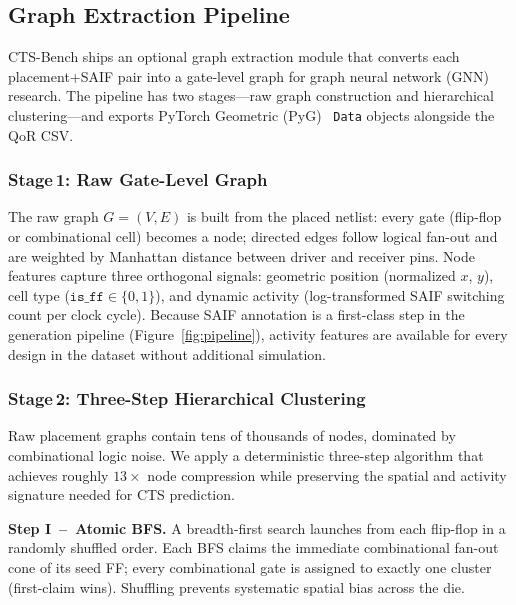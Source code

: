 \documentclass[acmsmall,review,anonymous]{acmart}
\begin{document}
\subsection{Graph Extraction Pipeline}
\label{sec:graph}

CTS-Bench ships an optional graph extraction module that converts each
placement+SAIF pair into a gate-level graph for graph neural network (GNN)
research.  The pipeline has two stages---raw graph construction and
hierarchical clustering---and exports PyTorch Geometric (PyG)~\cite{kipf2017semisupervisedclassificationgraphconvolutional}
\texttt{Data} objects alongside the QoR CSV.

\subsubsection*{Stage\,1: Raw Gate-Level Graph}

The raw graph $G=(V,E)$ is built from the placed netlist: every gate
(flip-flop or combinational cell) becomes a node; directed edges follow
logical fan-out and are weighted by Manhattan distance between driver and
receiver pins.  Node features capture three orthogonal signals: geometric
position (normalized $x$, $y$), cell type ($\texttt{is\_ff}\in\{0,1\}$),
and dynamic activity (log-transformed SAIF switching count per clock cycle).
Because SAIF annotation is a first-class step in the generation pipeline
(Figure~\ref{fig:pipeline}), activity features are available for every
design in the dataset without additional simulation.

\subsubsection*{Stage\,2: Three-Step Hierarchical Clustering}

Raw placement graphs contain tens of thousands of nodes, dominated by
combinational logic noise.  We apply a deterministic three-step algorithm
that achieves roughly $13{\times}$ node compression while preserving the
spatial and activity signature needed for CTS prediction.

\medskip\noindent\textbf{Step I~--~Atomic BFS.}
A breadth-first search launches from each flip-flop in a randomly shuffled
order.  Each BFS claims the immediate combinational fan-out cone of its seed
FF; every combinational gate is assigned to exactly one cluster (first-claim
wins).  Shuffling prevents systematic spatial bias across the die.
\end{document}
